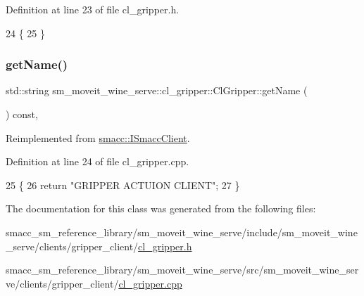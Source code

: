 Definition at line 23 of file cl\+\_\+gripper.\+h.


\begin{DoxyCode}
24   \{
25   \}
\end{DoxyCode}
\mbox{\label{classsm__moveit__wine__serve_1_1cl__gripper_1_1ClGripper_a1c566c9ae76fcd58b35f1831b0eceabe}} 
\subsubsection{\texorpdfstring{get\+Name()}{getName()}}
{\footnotesize\ttfamily std\+::string sm\+\_\+moveit\+\_\+wine\+\_\+serve\+::cl\+\_\+gripper\+::\+Cl\+Gripper\+::get\+Name (\begin{DoxyParamCaption}{ }\end{DoxyParamCaption}) const\hspace{0.3cm}{\ttfamily [override]}, {\ttfamily [virtual]}}



Reimplemented from \hyperlink{classsmacc_1_1ISmaccClient_a8c3ce19f182e71909c5dc6263d25be69}{smacc\+::\+I\+Smacc\+Client}.



Definition at line 24 of file cl\+\_\+gripper.\+cpp.


\begin{DoxyCode}
25 \{
26     \textcolor{keywordflow}{return} \textcolor{stringliteral}{"GRIPPER ACTUION CLIENT"};
27 \}
\end{DoxyCode}


The documentation for this class was generated from the following files\+:\begin{DoxyCompactItemize}
\item 
smacc\+\_\+sm\+\_\+reference\+\_\+library/sm\+\_\+moveit\+\_\+wine\+\_\+serve/include/sm\+\_\+moveit\+\_\+wine\+\_\+serve/clients/gripper\+\_\+client/\hyperlink{sm__moveit__wine__serve_2include_2sm__moveit__wine__serve_2clients_2gripper__client_2cl__gripper_8h}{cl\+\_\+gripper.\+h}\item 
smacc\+\_\+sm\+\_\+reference\+\_\+library/sm\+\_\+moveit\+\_\+wine\+\_\+serve/src/sm\+\_\+moveit\+\_\+wine\+\_\+serve/clients/gripper\+\_\+client/\hyperlink{sm__moveit__wine__serve_2src_2sm__moveit__wine__serve_2clients_2gripper__client_2cl__gripper_8cpp}{cl\+\_\+gripper.\+cpp}\end{DoxyCompactItemize}
